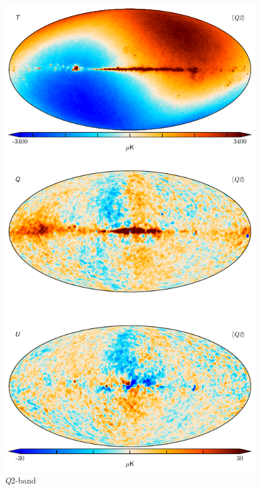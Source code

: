 \documentclass[twocolumn]{../../common/aa}
\newcommand{\Q}[0]{\textit Q}
\begin{document}
\begin{figure}
	\centering
	\includegraphics[height=0.9\textheight]{figures/040-WMAP_Q2_map.pdf}
	\caption{\Q2-band}
\end{figure}
\end{document}
